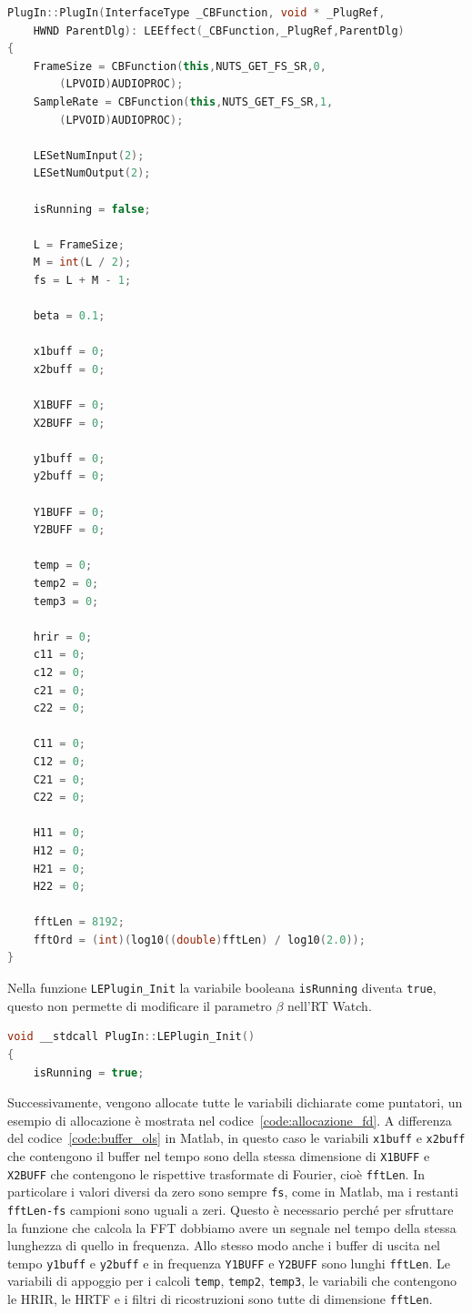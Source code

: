 \documentclass[12pt,a4paper,titlepage]{article}
\begin{document}
\begin{lstlisting}[language=cpp, label=code:costruttore, caption = Costruttore, breaklines = false, captionpos = b]
PlugIn::PlugIn(InterfaceType _CBFunction, void * _PlugRef, 
	HWND ParentDlg): LEEffect(_CBFunction,_PlugRef,ParentDlg)
{
	FrameSize = CBFunction(this,NUTS_GET_FS_SR,0,
		(LPVOID)AUDIOPROC);
	SampleRate = CBFunction(this,NUTS_GET_FS_SR,1,
		(LPVOID)AUDIOPROC);

	LESetNumInput(2);
	LESetNumOutput(2);
	
	isRunning = false;

	L = FrameSize;
	M = int(L / 2);
	fs = L + M - 1;

	beta = 0.1;

	x1buff = 0;
	x2buff = 0;

	X1BUFF = 0;
	X2BUFF = 0;

	y1buff = 0;
	y2buff = 0;

	Y1BUFF = 0;
	Y2BUFF = 0;
	
	temp = 0;
	temp2 = 0;
	temp3 = 0;

	hrir = 0;
	c11 = 0;
	c12 = 0;
	c21 = 0;
	c22 = 0;

	C11 = 0;
	C12 = 0;
	C21 = 0;
	C22 = 0;

	H11 = 0;
	H12 = 0;
	H21 = 0;
	H22 = 0;
	
	fftLen = 8192;
	fftOrd = (int)(log10((double)fftLen) / log10(2.0));
}
\end{lstlisting}

Nella funzione \texttt{LEPlugin\_Init} la variabile booleana \texttt{isRunning} diventa \texttt{true}, questo non permette di modificare il parametro $\beta$ nell'RT Watch.

\begin{lstlisting}[language=cpp, label=code:isRunning_init, caption = Variabile \texttt{isRunning} nella funzione \texttt{LEPlugin\_Init}, breaklines = false, captionpos = b]
void __stdcall PlugIn::LEPlugin_Init()
{
	isRunning = true;
\end{lstlisting}

Successivamente, vengono allocate tutte le variabili dichiarate come puntatori, un esempio di allocazione è mostrata nel codice~\ref{code:allocazione_fd}. A differenza del codice~\ref{code:buffer_ols} in Matlab, in questo caso le variabili \texttt{x1buff} e \texttt{x2buff} che contengono il buffer nel tempo sono della stessa dimensione di \texttt{X1BUFF} e \texttt{X2BUFF} che contengono le rispettive trasformate di Fourier, cioè \texttt{fftLen}. In particolare i valori diversi da zero sono sempre \texttt{fs}, come in Matlab, ma i restanti \texttt{fftLen-fs} campioni sono uguali a zeri. Questo è necessario perché per sfruttare la funzione che calcola la FFT dobbiamo avere un segnale nel tempo della stessa lunghezza di quello in frequenza. Allo stesso modo anche i buffer di uscita nel tempo \texttt{y1buff} e \texttt{y2buff} e in frequenza \texttt{Y1BUFF} e \texttt{Y2BUFF} sono lunghi \texttt{fftLen}. Le variabili di appoggio per i calcoli \texttt{temp}, \texttt{temp2}, \texttt{temp3}, le variabili che contengono le HRIR, le HRTF e i filtri di ricostruzioni sono tutte di dimensione	 \texttt{fftLen}.
\end{document}

